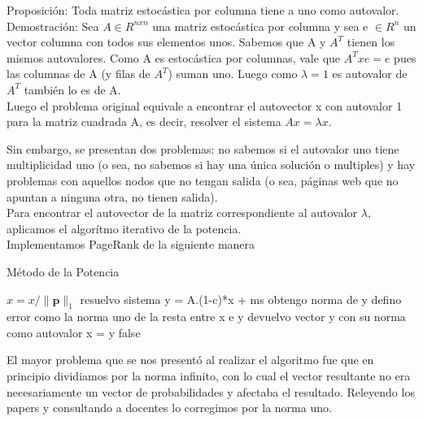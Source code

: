 Proposición: Toda matriz estocástica por columna tiene a uno como autovalor.
Demostración: Sea $A \in R^{nxn}$ una matriz estocástica por columna y sea e $\in R^{n}$ un vector columna con todos sus elementos unos. Sabemos que A y $A^{T}$ tienen los mismos autovalores.
Como A es estocástica por columnas, vale que $A^{T} x e = e$ pues las columnas de A (y filas de $A^{T}$) suman uno. Luego como $\lambda = 1$ es autovalor de $A^{T}$ también lo es de A. \\

Luego el problema original equivale a encontrar el autovector x con autovalor 1 para la matriz cuadrada A, es decir, resolver el sistema $Ax = \lambda x$.

Sin embargo, se presentan dos problemas: no sabemos si el autovalor uno tiene multiplicidad uno (o sea, no sabemos si hay una única solución o multiples) y  hay problemas con aquellos nodos que no tengan salida (o sea, páginas web que no apuntan a ninguna otra, no tienen salida).\\



Para encontrar el autovector de la matriz correspondiente al autovalor $\lambda$, aplicamos el algorítmo iterativo de la potencia.\\

Implementamos PageRank de la siguiente manera \\


\begin{algorithm}
\caption{Método de la Potencia}\label{metpot}
\begin{algorithmic}[1]


    \State $x = x/\lVert \mathbf{p} \rVert _{1}$
	    \State resuelvo sistema y = A.(1-c)*x + ms
 	    \State obtengo norma de y
 	    \State 	defino error como la norma uno de la resta entre x e y
      	\State devuelvo vector y con su norma como autovalor
      \Else
        \State x = y
      \EndIf
    \EndWhile
    \Return false
  \EndFunction

\end{algorithmic}
\end{algorithm}


\newpage
El mayor problema que se nos presentó al realizar el algoritmo fue que en principio dividiamos por la norma infinito, con lo cual el vector resultante no era necesariamente un vector de probabilidades y afectaba el resultado. Releyendo los papers y consultando a docentes lo corregimos por la norma uno.\\


